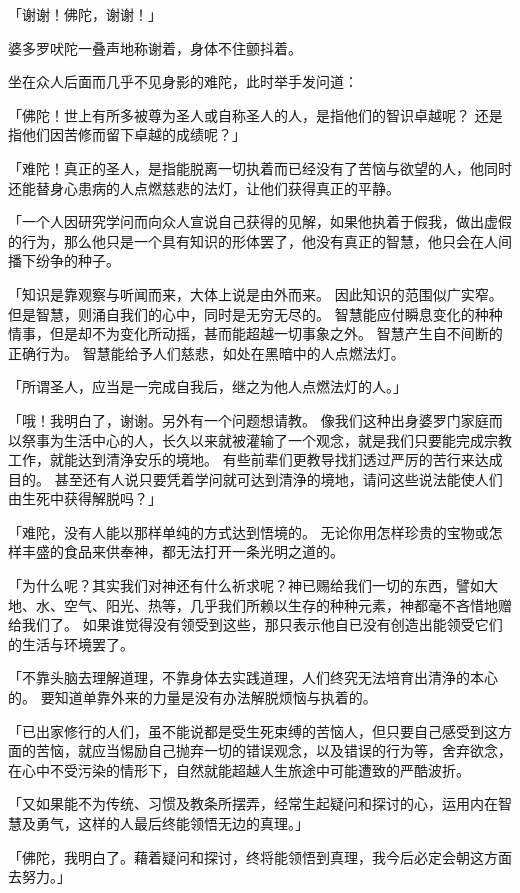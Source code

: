 \documentclass[twoside,openany]{book}
\begin{document}
「谢谢！佛陀，谢谢！」

婆多罗吠陀一叠声地称谢着，身体不住颤抖着。

坐在众人后面而几乎不见身影的难陀，此时举手发问道：

「佛陀！世上有所多被尊为圣人或自称圣人的人，是指他们的智识卓越呢？
还是指他们因苦修而留下卓越的成绩呢？」

「难陀！真正的圣人，是指能脱离一切执着而已经没有了苦恼与欲望的人，他同时还能替身心患病的人点燃慈悲的法灯，让他们获得真正的平静。

「一个人因研究学问而向众人宣说自己获得的见解，如果他执着于假我，做出虚假的行为，那么他只是一个具有知识的形体罢了，他没有真正的智慧，他只会在人间播下纷争的种子。

「知识是靠观察与听闻而来，大体上说是由外而来。
因此知识的范围似广实窄。
但是智慧，则涌自我们的心中，同时是无穷无尽的。
智慧能应付瞬息变化的种种情事，但是却不为变化所动摇，甚而能超越一切事象之外。
智慧产生自不间断的正确行为。
智慧能给予人们慈悲，如处在黑暗中的人点燃法灯。

「所谓圣人，应当是一完成自我后，继之为他人点燃法灯的人。」

「哦！我明白了，谢谢。另外有一个问题想请教。
像我们这种出身婆罗门家庭而以祭事为生活中心的人，长久以来就被灌输了一个观念，就是我们只要能完成宗教工作，就能达到清浄安乐的境地。
有些前辈们更教导找扪透过严厉的苦行来达成目的。
甚至还有人说只要凭着学问就可达到清浄的境地，请问这些说法能使人们由生死中获得解脱吗？」

「难陀，没有人能以那样单纯的方式达到悟境的。
无论你用怎样珍贵的宝物或怎样丰盛的食品来供奉神，都无法打开一条光明之道的。

「为什么呢？其实我们对神还有什么祈求呢？神已赐给我们一切的东西，譬如大地、水、空气、阳光、热等，几乎我们所赖以生存的种种元素，神都毫不吝惜地赠给我们了。
如果谁觉得没有领受到这些，那只表示他自已没有创造出能领受它们的生活与环境罢了。

「不靠头脑去理解道理，不靠身体去实践道理，人们终究无法培育出清浄的本心的。
要知道单靠外来的力量是没有办法解脱烦恼与执着的。

「已出家修行的人们，虽不能说都是受生死束缚的苦恼人，但只要自己感受到这方面的苦恼，就应当惕励自己抛弃一切的错误观念，以及错误的行为等，舍弃欲念，在心中不受污染的情形下，自然就能超越人生旅途中可能遭致的严酷波折。

「又如果能不为传统、习惯及教条所摆弄，经常生起疑问和探讨的心，运用内在智慧及勇气，这样的人最后终能领悟无边的真理。」

「佛陀，我明白了。藉着疑问和探讨，终将能领悟到真理，我今后必定会朝这方面去努力。」
\end{document}
